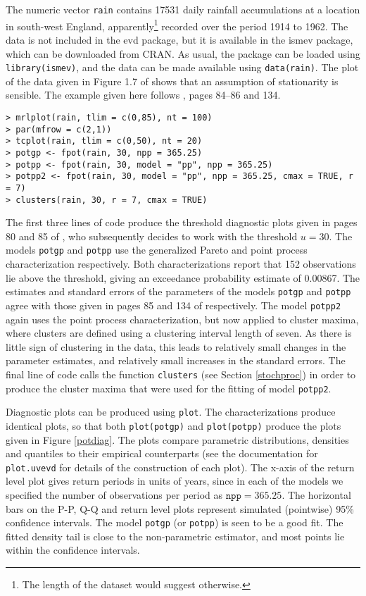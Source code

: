 \documentclass[11pt,a4paper]{article}
\begin{document}
The numeric vector \verb+rain+ contains 17531 daily rainfall accumulations at a location in south-west England, apparently\footnote{The length of the dataset would suggest otherwise.} recorded over the period 1914 to 1962.
The data is not included in the evd package, but it is available in the ismev package, which can be downloaded from CRAN. 
As usual, the package can be loaded using \verb+library(ismev)+, and the data can be made available using \verb+data(rain)+. 
The plot of the data given in Figure 1.7 of \citet{cole01} shows that an assumption of stationarity is sensible.
The example given here follows \citet{cole01}, pages 84--86 and 134.

\begin{verbatim}
> mrlplot(rain, tlim = c(0,85), nt = 100)
> par(mfrow = c(2,1))
> tcplot(rain, tlim = c(0,50), nt = 20)
> potgp <- fpot(rain, 30, npp = 365.25)
> potpp <- fpot(rain, 30, model = "pp", npp = 365.25)
> potpp2 <- fpot(rain, 30, model = "pp", npp = 365.25, cmax = TRUE, r = 7)
> clusters(rain, 30, r = 7, cmax = TRUE)
\end{verbatim}

The first three lines of code produce the threshold diagnostic plots given in pages 80 and 85 of \citet{cole01}, who subsequently decides to work with the threshold $u = 30$.
The models \verb+potgp+ and \verb+potpp+ use the generalized Pareto and point process characterization respectively.
Both characterizations report that 152 observations lie above the threshold, giving an exceedance probability estimate of 0.00867.
The estimates and standard errors of the parameters of the models \verb+potgp+ and \verb+potpp+ agree with those given in pages 85 and 134 of \citet{cole01} respectively.
The model \verb+potpp2+ again uses the point process characterization, but now applied to cluster maxima, where clusters are defined using a clustering interval length of seven.
As there is little sign of clustering in the data, this leads to relatively small changes in the parameter estimates, and relatively small increases in the standard errors.
The final line of code calls the function \verb+clusters+ (see Section \ref{stochproc}) in order to produce the cluster maxima that were used for the fitting of model \verb+potpp2+. 

Diagnostic plots can be produced using \verb+plot+.
The characterizations produce identical plots, so that both \verb+plot(potgp)+ and \verb+plot(potpp)+ produce the plots given in Figure \ref{potdiag}. 
The plots compare parametric distributions, densities and quantiles to their empirical counterparts (see the documentation for \verb+plot.uvevd+ for details of the construction of each plot).
The x-axis of the return level plot gives return periods in units of years, since in each of the models we specified the number of observations per period as $\texttt{npp} = 365.25$.
The horizontal bars on the P-P, Q-Q and return level plots represent simulated (pointwise) 95\% confidence intervals.
The model \verb+potgp+ (or \verb+potpp+) is seen to be a good fit. 
The fitted density tail is close to the non-parametric estimator, and most points lie within the confidence intervals.
\end{document}

